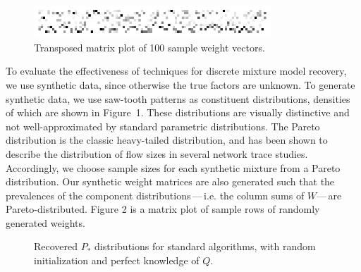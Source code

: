 \documentclass[conference]{IEEEtran}
\begin{document}
\begin{figure}[b]
\begin{center}
\includegraphics[width=3.5in]{synth/weights}
\end{center}
\vspace{-0.7em}
\caption{Transposed matrix plot of 100 sample weight vectors.}
\vspace{-0.3em}
\end{figure}

To evaluate the effectiveness of  techniques for discrete mixture model recovery, we use synthetic data, since otherwise the true factors are unknown.
To generate synthetic data, we use saw-tooth patterns as constituent distributions, densities of which are shown in Figure~1.
These distributions are visually distinctive and not well-approximated by standard parametric distributions.
The Pareto distribution is the classic heavy-tailed distribution, and has been shown to describe the distribution of flow sizes in several network trace studies.
Accordingly, we choose sample sizes for each synthetic mixture from a Pareto distribution.
Our synthetic weight matrices are also generated such that the prevalences of the component distributions\,---\,i.e. the column sums of $W$---\,are Pareto-distributed. Figure 2 is a matrix plot of sample rows of randomly generated weights.

\begin{figure}[t]
\begin{center}
\end{center}
\caption{Recovered $P_*$ distributions for standard  algorithms, with random initialization and perfect knowledge of $Q$.}
\end{figure}
\end{document}
